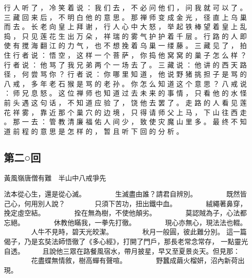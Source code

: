 {行 人 听 了 ， 冷 笑 着 说 ： 我 们 去 ， 不 必 问 他 们 ， 问 我 就 可 以 了 。
三 藏 回 来 后 ， 不 明 白 他 的 意 思 。
那 禅 师 变 成 金 光 ， 径 直 上 乌 巢 而 去 。
长 老 向 皇 上 拜 谢 ， 行 人 心 中 大 怒 ， 举 起 铁 棒 望 着 皇 上 乱 捣 ， 只 见 莲 花 生 出 万 朵 ， 祥 瑞 的 雾 气 护 护 着 千 层 。
行 路 的 人 即 使 有 搅 海 翻 江 的 力 气 ， 也 不 想 挽 着 乌 巢 一 缕 藤 。
三 藏 见 了 ， 拍 住 行 者 说 ： 悟 空 ， 这 样 一 个 菩 萨 ， 你 捣 他 窝 窝 的 巢 子 怎 么 样 ？ 行 者 说 ： 他 骂 了 我 兄 弟 两 个 一 场 去 了 。
三 藏 说 ： 他 讲 的 西 天 路 径 ， 何 尝 骂 你 ？ 行 者 说 ： 你 哪 里 知 道 ， 他 说 野 猪 挑 担 子 是 骂 的 八 戒 ， 多 年 老 石 猴 是 骂 的 老 孙 。
你 怎 么 知 道 这 个 意 思 ？ 八 戒 说 ： 师 兄 息 怒 。
这 位 禅 师 也 知 道 过 去 未 来 的 事 情 ， 只 看 他 的 水 怪 前 头 遇 这 句 话 ， 不 知 道 应 验 了 ， 饶 他 去 罢 了 。
走 路 的 人 看 见 莲 花 祥 雾 ， 靠 近 那 个 巢 穴 的 边 境 ， 只 得 请 师 父 上 马 ， 下 山 往 西 走 。
那 一 去 ： 管 教 清 廉 福 佑 人 间 少 ， 致 使 灾 魔 山 里 多 。
最 终 不 知 道 前 程 的 意 思 是 怎 样 的 ， 暂 且 听 下 回 的 分 析 。
}\switchcolumn\flushpage  \begin{pinyinscope}{\myfontt \section{第二○回}     黃風嶺唐僧有難　半山中八戒爭先

法本從心生，還是從心滅。
　　　　生滅盡由誰？請君自辨別。
　　　　既然皆己心，何用別人說？
　　　　只須下苦功，扭出鐵中血。
　　　　絨繩著鼻穿，挽定虛空結。
　　　　拴在無為樹，不使他顛劣。
　　　　莫認賊為子，心法都忘絕。
　　　　休教他瞞我，一拳先打徹。
　　　　現心亦無心，現法法也輟。
　　　　人牛不見時，碧天光皎潔。
　　　　秋月一般圓，彼此難分別。
這一篇偈子，乃是玄奘法師悟徹了《多心經》，打開了門戶，那長老常念常存，
一點靈光自透。
　　
且說他三眾在路餐風宿水，帶月披星，早又至夏景炎天。但見那：
　　　　花盡蝶無情敘，樹高蟬有聲喧。
　　　　野蠶成繭火榴妍，沼內新荷出現。

}
\end{pinyinscope}
